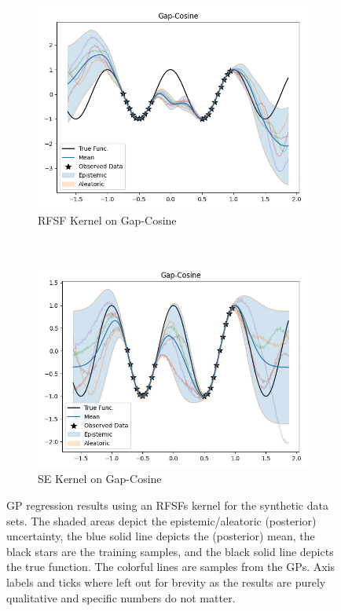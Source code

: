 \begin{figure}
\begin{subfigure}{0.49\linewidth}
			\centering
			\includegraphics[width=\linewidth, height=0.618033988749895\linewidth]{graphics/generated/gp-gapcosine-rfsf.png}  %
			\caption{\acs{RFSF} Kernel on Gap-Cosine}
			\label{fig:syntheticResultPlotRfsfGapCosine}
		\end{subfigure}
		~
		\begin{subfigure}{0.49\linewidth}
			\centering
			\includegraphics[width=\linewidth, height=0.618033988749895\linewidth]{graphics/generated/gp-gapcosine-rbf.png}  %
			\caption{\acs{SE} Kernel on Gap-Cosine}
			\label{fig:syntheticResultPlotSeGapCosine}
		\end{subfigure}
		\caption{
			\acl{GP} regression results using an \acsp{RFSF} kernel for the synthetic data sets.
			The shaded areas depict the epistemic/aleatoric (posterior) uncertainty, the blue solid line depicts the (posterior) mean, the black stars are the training samples, and the black solid line depicts the true function.
			The colorful lines are samples from the \acsp{GP}.
			Axis labels and ticks where left out for brevity as the results are purely qualitative and specific numbers do not matter.
		}
		\label{fig:syntheticResultPlot}
	\end{figure}

